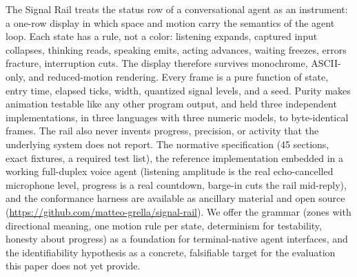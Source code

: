 \documentclass[11pt]{article}
\begin{document}
The Signal Rail treats the status row of a conversational agent as an
instrument: a one-row display in which space and motion carry the
semantics of the agent loop. Each state has a rule, not a color:
listening expands, captured input collapses, thinking reads, speaking
emits, acting advances, waiting freezes, errors fracture, interruption cuts. The display therefore survives monochrome, ASCII-only, and
reduced-motion rendering. Every frame is a pure function of state,
entry time, elapsed ticks, width, quantized signal levels, and a seed. Purity makes animation testable like any other program output, and held three independent implementations, in three languages with three numeric models, to byte-identical frames. The rail also never invents progress, precision, or activity that the underlying system does not report. The normative specification (45 sections, exact
fixtures, a required test list), the reference implementation embedded
in a working full-duplex voice agent (listening amplitude is the real echo-cancelled microphone level, progress is a real countdown, barge-in cuts the rail mid-reply), and the conformance harness are
available as ancillary material and open source
(\url{https://github.com/matteo-grella/signal-rail}). We offer the grammar (zones with directional meaning, one motion rule per state, determinism for testability, honesty about progress) as a foundation for terminal-native agent interfaces, and the
identifiability hypothesis as a concrete, falsifiable target for the
evaluation this paper does not yet provide.
\end{document}
